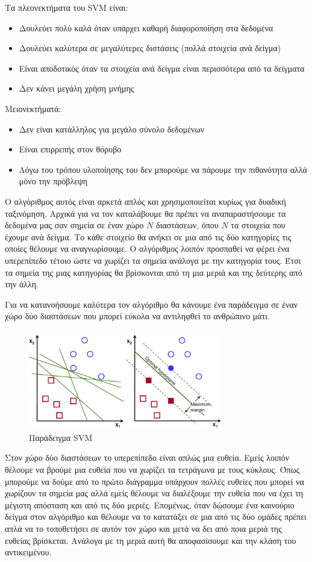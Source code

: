 Τα πλεονεκτήματα του \textlatin{SVM} είναι\cite{svm1}:
\begin{itemize}
    \item Δουλεύει πολύ καλά όταν υπάρχει καθαρή διαφοροποίηση στα δεδομένα
    \item Δουλεύει καλύτερα σε μεγαλύτερες διστάσεις (πολλά στοιχεία ανά δείγμα)
    \item Είναι αποδοτικός όταν τα στοιχεία ανά δείγμα είναι περισσότερα από τα δείγματα
    \item Δεν κάνει μεγάλη χρήση μνήμης
\end{itemize}
Μειονεκτήματά:
\begin{itemize}
    \item Δεν είναι κατάλληλος για μεγάλο σύνολο δεδομένων
    \item Είναι επιρρεπής στον θόρυβο
    \item Λόγω του τρόπου υλοποίησης του δεν μπορούμε να πάρουμε την πιθανότητα αλλά μόνο
    την πρόβλεψη
\end{itemize}

Ο αλγόριθμος αυτός είναι αρκετά απλός και χρησιμοποιείται κυρίως για δυαδική ταξινόμηση. Αρχικά
για να τον καταλάβουμε θα πρέπει να αναπαραστήσουμε τα δεδομένα μας σαν σημεία σε έναν χώρο $N$
διαστάσεων, όπου $N$ τα στοιχεία που έχουμε ανά δείγμα. Το κάθε στοιχείο θα ανήκει σε μια από τις
δύο κατηγορίες τις οποίες θέλουμε να αναγνωρίσουμε. Ο αλγόριθμος λοιπόν προσπαθεί να φέρει ένα
υπερεπίπεδο τέτοιο ώστε να χωρίζει τα σημεία ανάλογα με την κατηγορία τους. Έτσι τα σημεία της
μιας κατηγορίας θα βρίσκονται από τη μια μεριά και της δεύτερης από την άλλη.

Για να κατανοήσουμε καλύτερα τον αλγόριθμο θα κάνουμε ένα παράδειγμα σε έναν χώρο δύο διαστάσεων
που μπορεί εύκολα να αντιληφθεί το ανθρώπινο μάτι.
\begin{figure}[H]
    \centering
    \includegraphics[width=0.75\textwidth]{images/svm.png}
    \caption{Παράδειγμα \textlatin{SVM}}
\end{figure}
Στον χώρο δύο διαστάσεων το υπερεπίπεδο είναι απλώς μια ευθεία. Εμείς λοιπόν θέλουμε να βρούμε μια
ευθεία που να χωρίζει τα τετράγωνα με τους κύκλους. Όπως μπορούμε να δούμε από το πρώτο διάγραμμα
υπάρχουν πολλές ευθείες που μπορεί να χωρίζουν τα σημεία μας αλλά εμείς θέλουμε να διαλέξουμε την
ευθεία που να έχει τη μέγιστη απόσταση και από τις δύο μεριές. Επομένως, όταν δώσουμε ένα
καινούριο δείγμα στον αλγόριθμο και θέλουμε να το κατατάξει σε μια από τις δύο ομάδες πρέπει απλά
να το τοποθετήσει σε αυτόν τον χώρο και μετά να δει από ποια μεριά της ευθείας βρίσκεται. Ανάλογα
με τη μεριά αυτή θα αποφασίσουμε και την κλάση του αντικειμένου.

